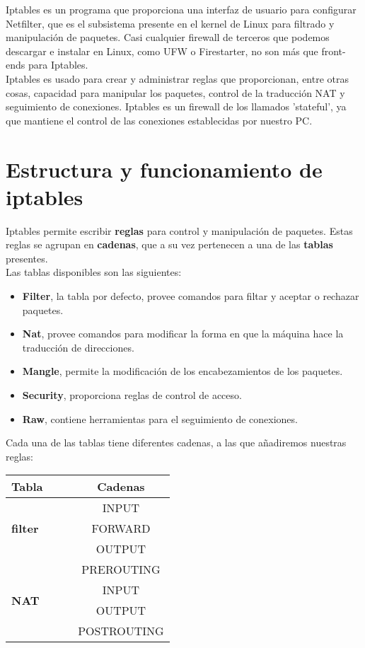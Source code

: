 Iptables es un programa que proporciona una interfaz de usuario para configurar Netfilter, que es el subsistema presente en el kernel de Linux para filtrado y manipulación de paquetes. Casi cualquier firewall de terceros que podemos descargar e instalar en Linux, como UFW o Firestarter, no son más que front-ends para Iptables.\\

Iptables es usado para crear y administrar reglas que proporcionan, entre otras cosas, capacidad para manipular los paquetes, control de la traducción NAT y seguimiento de conexiones. Iptables es un firewall de los llamados 'stateful', ya que mantiene el control de las conexiones establecidas por nuestro PC.

\section{Estructura y funcionamiento de iptables}
Iptables permite escribir \textbf{reglas} para control y manipulación de paquetes. Estas reglas se agrupan en \textbf{cadenas}, que a su vez pertenecen a una de las \textbf{tablas} presentes. \\

Las tablas disponibles son las siguientes:
\begin{itemize}
\item \textbf{Filter}, la tabla por defecto, provee comandos para filtar y aceptar o rechazar paquetes.
\item \textbf{Nat}, provee comandos para modificar la forma en que la máquina hace la traducción de direcciones.
\item \textbf{Mangle}, permite la modificación de los encabezamientos de los paquetes.
\item \textbf{Security}, proporciona reglas de control de acceso.
\item \textbf{Raw}, contiene herramientas para el seguimiento de conexiones.
\end{itemize}

Cada una de las tablas tiene diferentes cadenas, a las que añadiremos nuestras reglas:

\begin{longtable}{l | c}
\textbf{Tabla} \ \ \ & \textbf{Cadenas}\\\hline
\multirow{3}{*}{\textbf{filter}} & INPUT\\
& FORWARD\\
& OUTPUT\\\hline
\multirow{4}{*}{\textbf{NAT}} & PREROUTING\\
& INPUT\\
& OUTPUT\\
& POSTROUTING\\
\end{longtable}

